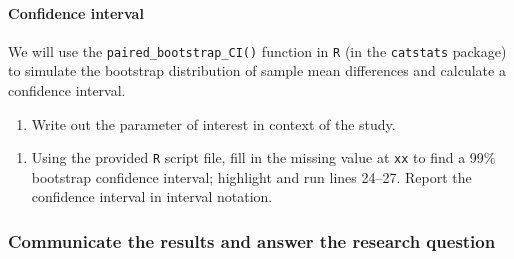\documentclass[
]{report}
\newenvironment{Shaded}{\begin{snugshade}}{\end{snugshade}}
\newcommand{\AttributeTok}[1]{\textcolor[rgb]{0.77,0.63,0.00}{#1}}
\newcommand{\CommentTok}[1]{\textcolor[rgb]{0.56,0.35,0.01}{\textit{#1}}}
\newcommand{\DecValTok}[1]{\textcolor[rgb]{0.00,0.00,0.81}{#1}}
\newcommand{\FunctionTok}[1]{\textcolor[rgb]{0.00,0.00,0.00}{#1}}
\newcommand{\NormalTok}[1]{#1}
\newcommand{\SpecialCharTok}[1]{\textcolor[rgb]{0.00,0.00,0.00}{#1}}
\providecommand{\tightlist}{%
  \setlength{\itemsep}{0pt}\setlength{\parskip}{0pt}}
\begin{document}
\vspace{.5in}

\hypertarget{confidence-interval}{%
\paragraph*{Confidence interval}\label{confidence-interval}}

We will use the \texttt{paired\_bootstrap\_CI()} function in \texttt{R} (in the \texttt{catstats} package) to simulate the bootstrap distribution of sample mean differences and calculate a confidence interval.

\begin{enumerate}
\def\labelenumi{\arabic{enumi}.}
\setcounter{enumi}{19}
\tightlist
\item
  Write out the parameter of interest in context of the study.
\end{enumerate}

\vspace{.6in}

\begin{enumerate}
\def\labelenumi{\arabic{enumi}.}
\setcounter{enumi}{20}
\tightlist
\item
  Using the provided \texttt{R} script file, fill in the missing value at \texttt{xx} to find a 99\% bootstrap confidence interval; highlight and run lines 24--27. Report the confidence interval in interval notation.
\end{enumerate}

\begin{Shaded}
\end{Shaded}

\vspace{.5in}

\hypertarget{communicate-the-results-and-answer-the-research-question-2}{%
\subsubsection*{Communicate the results and answer the research question}\label{communicate-the-results-and-answer-the-research-question-2}}
\end{document}
